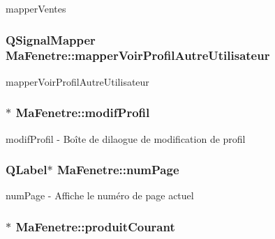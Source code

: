 mapper\-Ventes 

\hypertarget{class_ma_fenetre_aebcdfc6851c15fb565569746b17a1691}{
\subsubsection[{mapper\-Voir\-Profil\-Autre\-Utilisateur}]{\setlength{\rightskip}{0pt plus 5cm}Q\-Signal\-Mapper Ma\-Fenetre\-::mapper\-Voir\-Profil\-Autre\-Utilisateur\hspace{0.3cm}{\ttfamily [protected]}}}\label{class_ma_fenetre_aebcdfc6851c15fb565569746b17a1691}


mapper\-Voir\-Profil\-Autre\-Utilisateur 

\hypertarget{class_ma_fenetre_accfaae414323cd476f255f51a98414f0}{
\subsubsection[{modif\-Profil}]{$\ast$ Ma\-Fenetre\-::modif\-Profil\hspace{0.3cm}{\ttfamily [protected]}}}\label{class_ma_fenetre_accfaae414323cd476f255f51a98414f0}


modif\-Profil -\/ Boîte de dilaogue de modification de profil 

\hypertarget{class_ma_fenetre_a941eff753d1e20d0ef212aa875570330}{
\subsubsection[{num\-Page}]{\setlength{\rightskip}{0pt plus 5cm}Q\-Label$\ast$ Ma\-Fenetre\-::num\-Page\hspace{0.3cm}{\ttfamily [protected]}}}\label{class_ma_fenetre_a941eff753d1e20d0ef212aa875570330}


num\-Page -\/ Affiche le numéro de page actuel 

\hypertarget{class_ma_fenetre_abc16cc0e7668b65019bffe2d595be2a0}{
\subsubsection[{produit\-Courant}]{$\ast$ Ma\-Fenetre\-::produit\-Courant\hspace{0.3cm}{\ttfamily [protected]}}}\label{class_ma_fenetre_abc16cc0e7668b65019bffe2d595be2a0}


